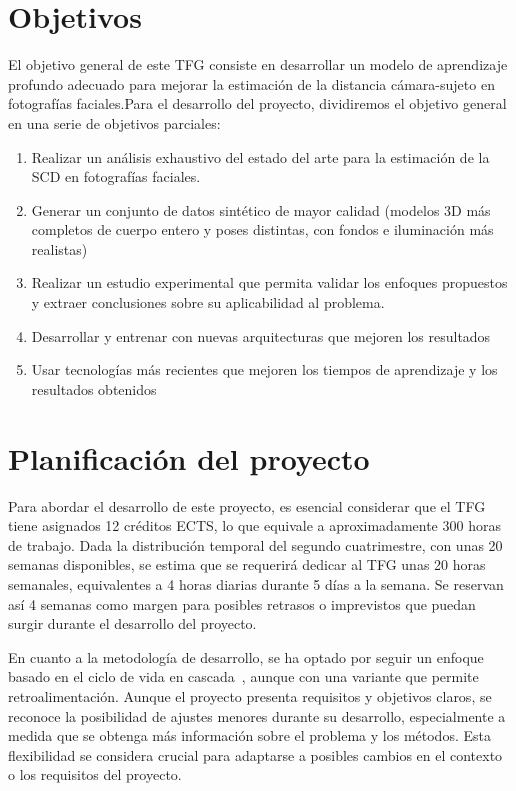 \section{Objetivos}
 El objetivo general de este TFG consiste en desarrollar un modelo de aprendizaje profundo adecuado para mejorar la estimación de la distancia cámara-sujeto en fotografías faciales.Para el desarrollo del proyecto, dividiremos el objetivo general en una serie de objetivos parciales:
\begin{enumerate}
    \item Realizar un análisis exhaustivo del estado del arte para la estimación de la SCD en fotografías faciales.
    \item Generar un conjunto de datos sintético de mayor calidad (modelos 3D más completos de cuerpo entero y poses distintas, con fondos e iluminación más realistas)
    \item Realizar un estudio experimental que permita validar los enfoques propuestos y extraer conclusiones sobre su aplicabilidad al problema.
    \item Desarrollar y entrenar con nuevas arquitecturas que mejoren los resultados
    \item Usar tecnologías más recientes que mejoren los tiempos de aprendizaje y los resultados obtenidos
\end{enumerate}

\section{Planificación del proyecto}

Para abordar el desarrollo de este proyecto, es esencial considerar que el TFG tiene asignados 12 créditos ECTS, lo que equivale a aproximadamente 300 horas de trabajo. Dada la distribución temporal del segundo cuatrimestre, con unas 20 semanas disponibles, se estima que se requerirá dedicar al TFG unas 20 horas semanales, equivalentes a 4 horas diarias durante 5 días a la semana. Se reservan así 4 semanas como margen para posibles retrasos o imprevistos que puedan surgir durante el desarrollo del proyecto.

En cuanto a la metodología de desarrollo, se ha optado por seguir un enfoque basado en el ciclo de vida en cascada~\cite{38}, aunque con una variante que permite retroalimentación. Aunque el proyecto presenta requisitos y objetivos claros, se reconoce la posibilidad de ajustes menores durante su desarrollo, especialmente a medida que se obtenga más información sobre el problema y los métodos. Esta flexibilidad se considera crucial para adaptarse a posibles cambios en el contexto o los requisitos del proyecto.

